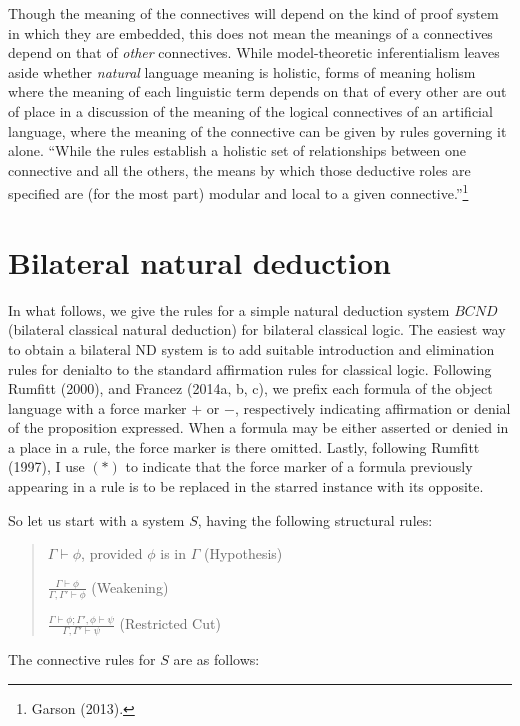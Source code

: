 \documentclass[]{article}
\begin{document}
Though the meaning of the connectives will depend on the kind of proof system in which they are embedded, this does not mean the meanings of a connectives depend on that of \textit{other} connectives. While model-theoretic inferentialism leaves aside whether \textit{natural} language meaning is holistic, forms of meaning holism where the meaning of each linguistic term depends on that of every other are out of place in a discussion of the meaning of the logical connectives of an artificial language, where the meaning of the connective can be given by rules governing it alone. ``While the rules establish a holistic set of relationships between one connective and all the others, the means by which those deductive roles are specified are (for the most part) modular and local to a given connective.''\footnote{Garson (2013).}

\section{Bilateral natural deduction}
In what follows, we give the rules for a simple natural deduction system $BCND$ (bilateral classical natural deduction) for bilateral classical logic. The easiest way to obtain a bilateral ND system is to add suitable introduction and elimination rules for denialto to the standard affirmation rules for classical logic. Following Rumfitt (2000), and Francez (2014a, b, c), we prefix each formula of the object language with a force marker $+$ or $-$, respectively indicating affirmation or denial of the proposition expressed. When a formula may be either asserted or denied in a place in a rule, the force marker is there omitted. Lastly, following Rumfitt (1997), I use $(*)$ to indicate that the force marker of a formula previously appearing in a rule is to be replaced in the starred instance with its opposite. 

So let us start with a system $S$, having the following structural rules:

\begin{quote}
$\Gamma \vdash \phi$, provided $\phi$ is in $\Gamma$ (Hypothesis)

$\frac{\Gamma \vdash \phi}{\Gamma, \Gamma' \vdash \phi}$ (Weakening)

$\frac{\Gamma \vdash \phi; \Gamma', \phi \vdash \psi}{\Gamma, \Gamma' \vdash \psi}$ (Restricted Cut)
\end{quote}

The connective rules for $S$ are as follows:
\end{document}
